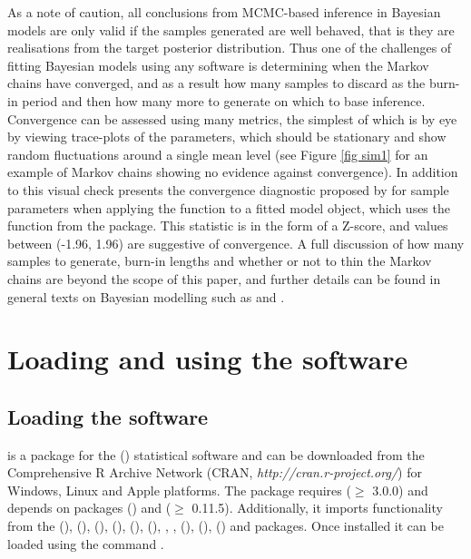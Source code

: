 \documentclass[article, nojss]{jss}
\begin{document}
As a note of caution, all conclusions from MCMC-based inference in Bayesian models are only valid if the samples generated are well  behaved, that is they are realisations from the target posterior distribution. Thus one of the challenges of fitting Bayesian models using any software is determining when the Markov chains have converged, and as a result how many samples to discard as the burn-in period and then how many more to generate on which to base inference. Convergence can be assessed using many metrics, the simplest of which is by eye by viewing trace-plots of the parameters, which should be stationary and show random fluctuations around a single mean level (see Figure \ref{fig sim1} for an example of Markov chains showing no evidence against convergence). In addition to this visual check  presents the convergence  diagnostic proposed by \cite{geweke1992} for sample parameters when applying the  function to a fitted model object, which uses the  function from the  package. This statistic is in the form of a Z-score, and values between (-1.96, 1.96) are suggestive of convergence. A full discussion of how many samples to generate, burn-in lengths and whether or not to thin the Markov chains are beyond the scope of this paper, and further details can be found in general texts on Bayesian modelling such as \cite{robert2010} and \cite{gelman2013}.


\section{Loading and using the software}

\subsection{Loading the software}
 is a package for the  (\citealp{R}) statistical software and can be downloaded from the Comprehensive R Archive Network (CRAN, \emph{http://cran.r-project.org/}) for Windows, Linux and Apple platforms.  The package requires  ($\geq$ 3.0.0) and depends on packages  (\citealp{mass2002}) and  ($\geq$ 0.11.5). Additionally, it imports functionality from the  (\citealp{carbayesdata}),   (\citealp{coda2006}),  (\citealp{dplyr2015}),  (\citealp{matrixcalc2012}),  (\citealp{bivand2013}),  (\citealp{spam2010}), , ,  (\citealp{testthat}),  (\citealp{truncdist2012}),  (\citealp{truncnorm2014}) and  packages. Once installed it can be loaded using the command .\\
\end{document}
